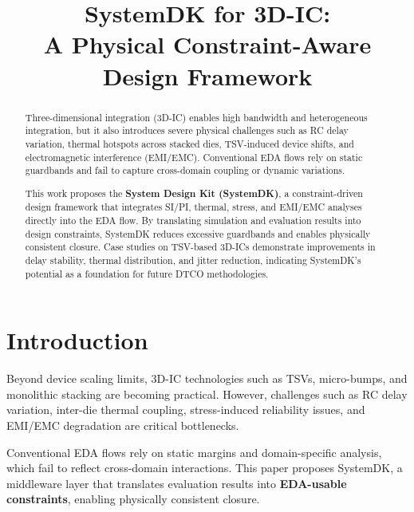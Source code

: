 \documentclass[conference]{IEEEtran}
\begin{document}
\title{SystemDK for 3D-IC:\\
A Physical Constraint-Aware Design Framework}

\author{
}

\maketitle

\begin{abstract}
Three-dimensional integration (3D-IC) enables high bandwidth and heterogeneous integration, but it also introduces severe physical challenges such as RC delay variation, thermal hotspots across stacked dies, TSV-induced device shifts, and electromagnetic interference (EMI/EMC). Conventional EDA flows rely on static guardbands and fail to capture cross-domain coupling or dynamic variations.

This work proposes the \textbf{System Design Kit (SystemDK)}, a constraint-driven design framework that integrates SI/PI, thermal, stress, and EMI/EMC analyses directly into the EDA flow. By translating simulation and evaluation results into design constraints, SystemDK reduces excessive guardbands and enables physically consistent closure. Case studies on TSV-based 3D-ICs demonstrate improvements in delay stability, thermal distribution, and jitter reduction, indicating SystemDK’s potential as a foundation for future DTCO methodologies.
\end{abstract}

\section{Introduction}
Beyond device scaling limits, 3D-IC technologies such as TSVs, micro-bumps, and monolithic stacking are becoming practical.
However, challenges such as RC delay variation, inter-die thermal coupling, stress-induced reliability issues, and EMI/EMC degradation are critical bottlenecks.

Conventional EDA flows rely on static margins and domain-specific analysis, which fail to reflect cross-domain interactions.
This paper proposes SystemDK, a middleware layer that translates evaluation results into \textbf{EDA-usable constraints}, enabling physically consistent closure.
\end{document}
